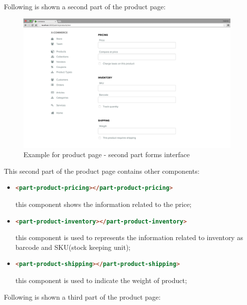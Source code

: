 Following is shown a second part of the product page:
\begin{figure}[htb]
\centering
\includegraphics[width=0.9\linewidth]{images/chapter4/product-page-ex2.png}\hfill
\caption[Product page second part form]{Example for product page - second part forms interface}
\label{fig:design_page}
\end{figure}
\newline
This second part of the product page contains other components:
\begin{itemize}
\item
\begin{lstlisting}[language=html]
<part-product-pricing></part-product-pricing>
\end{lstlisting}
this component shows the information related to the price;
\item
\begin{lstlisting}[language=html]
<part-product-inventory></part-product-inventory>
\end{lstlisting}
this component is used to represents the information related to inventory as barcode and SKU(stock keeping unit);
\item
\begin{lstlisting}[language=html]
<part-product-shipping></part-product-shipping>
\end{lstlisting}
this component is used to indicate the weight of product;
\end{itemize}
Following is shown a third part of the product page:
